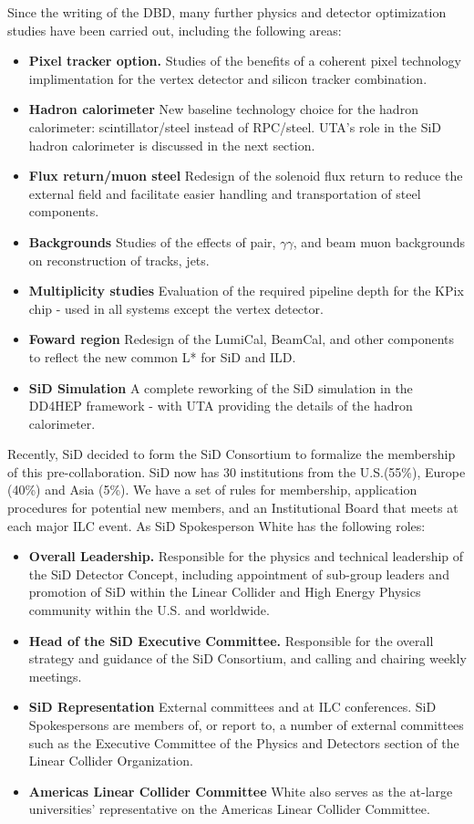 Since the writing of the DBD, many further physics and detector optimization studies have been carried
out, including the following areas:
\begin{itemize}
\item {\bf Pixel tracker option.} Studies of the benefits of a coherent pixel technology implimentation for the
vertex detector and silicon tracker combination.
\item {\bf Hadron calorimeter} New baseline technology choice for the hadron calorimeter: scintillator/steel instead of RPC/steel.
UTA's role in the SiD hadron calorimeter is discussed in the next section.
\item {\bf Flux return/muon steel} Redesign of the solenoid flux return to reduce the external field and facilitate easier handling
and transportation of steel components. 
\item {\bf Backgrounds} Studies of the effects of pair, $ \gamma\gamma $, and beam muon backgrounds on reconstruction of tracks, jets.
\item {\bf Multiplicity studies} Evaluation of the required pipeline depth for the KPix chip - used in all systems except the vertex
 detector.
 \item {\bf Foward region} Redesign of the LumiCal, BeamCal, and other components to reflect the new common L* for SiD and ILD.
 \item{\bf SiD Simulation} A complete reworking of the SiD simulation in the DD4HEP framework - with UTA providing the details
 of the hadron calorimeter.
 \end{itemize}
 
Recently, SiD decided to form the SiD Consortium to formalize the membership of this pre-collaboration.
SiD now has 30 institutions from the U.S.(55\%), Europe (40\%) and Asia (5\%).
We have a set of rules for membership, application procedures for potential new members, and an Institutional
Board that meets at each major ILC event. As SiD Spokesperson White has the following roles:

\begin{itemize}
\item {\bf Overall Leadership.} Responsible for the physics and technical leadership of the SiD Detector 
Concept, including appointment of sub-group leaders and promotion of SiD within the Linear Collider 
and High Energy Physics community within the U.S. and worldwide.
\item {\bf Head of the SiD Executive Committee.} Responsible for the overall strategy and guidance of 
the SiD Consortium, and calling and chairing weekly meetings.
\item {\bf SiD Representation} External committees and at ILC conferences. SiD Spokespersons are members of, 
or report to, a number of external committees such as the Executive Committee of the Physics and Detectors section of the 
Linear Collider Organization.
\item{\bf Americas Linear Collider Committee} White also serves as the at-large universities' representative on the 
Americas Linear Collider Committee.
\end{itemize}

